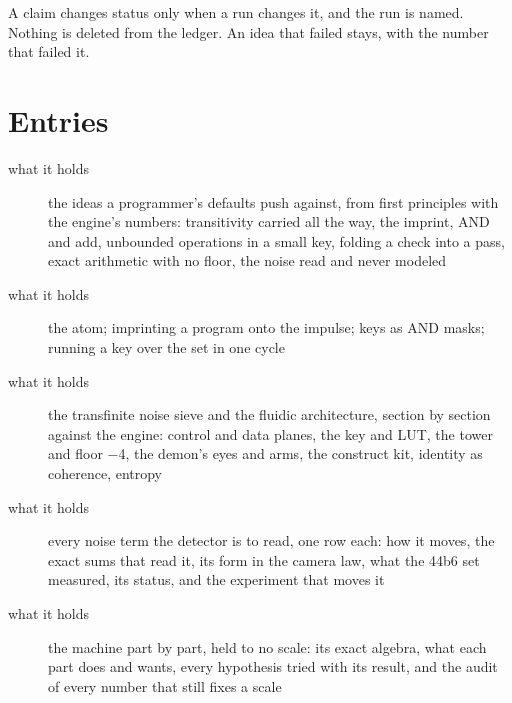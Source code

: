 A claim changes status only when a run changes it, and the run is named. Nothing is deleted from the ledger. An idea that failed stays, with the number that failed it.

\section{\texorpdfstring{Entries}{Entries}}

\begin{description}
\item[{what it holds}] the ideas a programmer's defaults push against, from first principles with the engine's numbers: transitivity carried all the way, the imprint, AND and add, unbounded operations in a small key, folding a check into a pass, exact arithmetic with no floor, the noise read and never modeled
\end{description}

\begin{description}
\item[{what it holds}] the atom; imprinting a program onto the impulse; keys as AND masks; running a key over the set in one cycle
\end{description}

\begin{description}
\item[{what it holds}] the transfinite noise sieve and the fluidic architecture, section by section against the engine: control and data planes, the key and LUT, the tower and floor −4, the demon's eyes and arms, the construct kit, identity as coherence, entropy
\end{description}

\begin{description}
\item[{what it holds}] every noise term the detector is to read, one row each: how it moves, the exact sums that read it, its form in the camera law, what the 44b6 set measured, its status, and the experiment that moves it
\end{description}

\begin{description}
\item[{what it holds}] the machine part by part, held to no scale: its exact algebra, what each part does and wants, every hypothesis tried with its result, and the audit of every number that still fixes a scale
\end{description}

